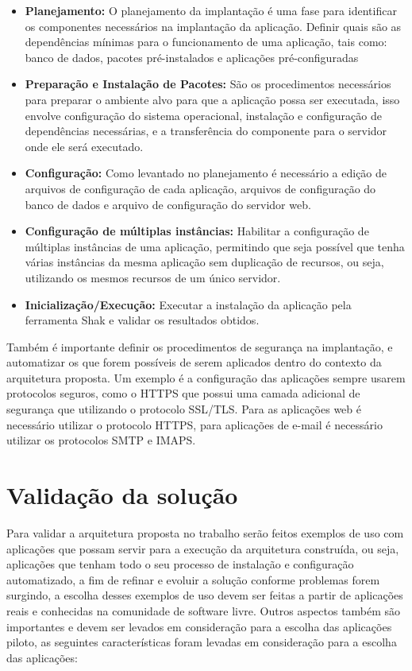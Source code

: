 \begin{itemize}
  \item  \textbf{Planejamento:} O planejamento da implantação é uma fase para
  identificar os componentes necessários na implantação da aplicação. Definir
  quais são as dependências mínimas
  para o funcionamento de uma aplicação, tais como: banco de dados, pacotes
  pré-instalados e aplicações pré-configuradas
  \item  \textbf{Preparação e Instalação de Pacotes:} São os procedimentos necessários
   para preparar o ambiente alvo para que a aplicação
  possa ser executada, isso envolve configuração do sistema operacional, instalação
  e configuração de dependências necessárias, e a transferência do componente
  para o servidor onde ele será executado.
  \item  \textbf{Configuração:} Como levantado no planejamento é necessário a
  edição de arquivos de configuração
  de cada aplicação, arquivos de configuração do banco de dados e arquivo de configuração
  do servidor web.
  \item  \textbf{Configuração de múltiplas instâncias:} Habilitar a configuração
  de múltiplas instâncias de uma aplicação, permitindo que seja possível que
  tenha várias instâncias da mesma aplicação sem duplicação de recursos, ou seja,
  utilizando os mesmos recursos de um único servidor.
  \item  \textbf{Inicialização/Execução:} Executar a instalação da aplicação pela
  ferramenta Shak e validar os resultados obtidos.
\end{itemize}

Também é importante definir os procedimentos de segurança na implantação, e
automatizar os que forem possíveis de serem aplicados dentro do contexto da
arquitetura proposta. Um exemplo
é a configuração das aplicações sempre usarem protocolos seguros, como o HTTPS
que possui uma camada adicional de segurança que utilizando o protocolo SSL/TLS.
Para as aplicações web é necessário utilizar o protocolo HTTPS, para aplicações
de e-mail é necessário utilizar os protocolos SMTP e IMAPS.

\section{Validação da solução}
\label{subsection:validacao}

Para validar a arquitetura proposta no trabalho serão feitos exemplos de uso
com aplicações que possam servir para a execução da arquitetura construída, ou seja,
aplicações que tenham todo o seu processo de instalação e configuração automatizado, a
fim de refinar e evoluir a solução conforme problemas forem surgindo, a escolha
desses exemplos de uso devem ser feitas a partir de aplicações reais e
conhecidas na comunidade de software livre. Outros aspectos também são importantes e
devem ser levados em consideração para a escolha das
aplicações piloto, as seguintes características foram levadas em consideração
para a escolha das aplicações:

